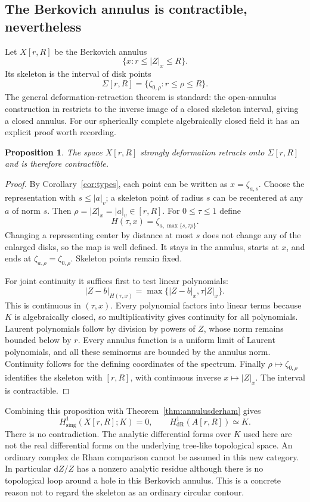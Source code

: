 \documentclass[11pt,a4paper]{article}
\numberwithin{equation}{section}
\newtheorem{proposition}[theorem]{Proposition}
\theoremstyle{definition}
\theoremstyle{remark}
\newcommand{\abs}[1]{\lvert#1\rvert}
\newcommand{\vabs}[1]{\lvert#1\rvert_v}
\newcommand{\dR}{\mathrm{dR}}
\begin{document}
\subsection{The Berkovich annulus is contractible, nevertheless}
Let $X[r,R]$ be the Berkovich annulus
\[
 \{x:r\le\abs Z_x\le R\}.
\]
Its skeleton is the interval of disk points
\begin{equation}\label{eq:skeleton}
 \Sigma[r,R]=\{\zeta_{0,\rho}:r\le\rho\le R\}.
\end{equation}
The general deformation-retraction theorem is standard: the open-annulus
construction in \cite[Lemma I.7.9 and Proposition I.7.11]{PT} restricts to
the inverse image of a closed skeleton interval, giving a closed annulus.
For our spherically complete algebraically closed field it has an explicit
proof worth recording.

\begin{proposition}\label{prop:annuluscontract}
The space $X[r,R]$ strongly deformation retracts onto $\Sigma[r,R]$ and is
therefore contractible.
\end{proposition}
\begin{proof}
By Corollary~\ref{cor:types}, each point can be written as $x=\zeta_{a,s}$.
Choose the representation with $s\le\vabs a$; a skeleton point of radius $s$
can be recentered at any $a$ of norm $s$. Then
$\rho=\abs Z_x=\vabs a\in[r,R]$. For $0\le\tau\le1$ define
\[
 H(\tau,x)=\zeta_{a,\max\{s,\tau\rho\}}.
\]
Changing a representing center by distance at most $s$ does not change any of
the enlarged disks, so the map is well defined. It stays in the annulus,
starts at $x$, and ends at
$\zeta_{a,\rho}=\zeta_{0,\rho}$. Skeleton points remain fixed.

For joint continuity it suffices first to test linear polynomials:
\[
 \abs{Z-b}_{H(\tau,x)}
   =\max\{\abs{Z-b}_x,\tau\abs Z_x\}.
\]
This is continuous in $(\tau,x)$. Every polynomial factors into linear terms
because $K$ is algebraically closed, so multiplicativity gives continuity for
all polynomials. Laurent polynomials follow by division by powers of $Z$,
whose norm remains bounded below by $r$. Every annulus function is a uniform
limit of Laurent polynomials, and all these seminorms are bounded by the
annulus norm. Continuity follows for the defining coordinates of the spectrum.
Finally $\rho\mapsto\zeta_{0,\rho}$ identifies the skeleton with $[r,R]$,
with continuous inverse $x\mapsto\abs Z_x$. The interval is contractible.
\end{proof}

Combining this proposition with Theorem~\ref{thm:annulusderham} gives
\begin{equation}\label{eq:comparisonfailure}
 H^1_{\mathrm{sing}}(X[r,R];K)=0,
 \qquad
 H^1_{\dR}(A[r,R])\simeq K.
\end{equation}
There is no contradiction. The analytic differential forms over $K$ used here
are not the real differential forms on the underlying tree-like topological
space. An ordinary complex de Rham comparison cannot be assumed in this new
category. In particular $\mathrm dZ/Z$ has a nonzero analytic residue although
there is no topological loop around a hole in this Berkovich annulus. This is a
concrete reason not to regard the skeleton as an ordinary circular contour.
\end{document}
